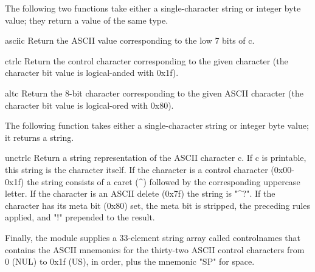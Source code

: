 The following two functions take either a single-character string or
integer byte value; they return a value of the same type.

\begin{funcdesc}{ascii}{c}
Return the ASCII value corresponding to the low 7 bits of c.
\end{funcdesc}

\begin{funcdesc}{ctrl}{c}
Return the control character corresponding to the given character
(the character bit value is logical-anded with 0x1f).
\end{funcdesc}

\begin{funcdesc}{alt}{c}
Return the 8-bit character corresponding to the given ASCII character
(the character bit value is logical-ored with 0x80).
\end{funcdesc}

The following function takes either a single-character string or
integer byte value; it returns a string.

\begin{funcdesc}{unctrl}{c}
Return a string representation of the ASCII character c.  If c is
printable, this string is the character itself.  If the character
is a control character (0x00-0x1f) the string consists of a caret
(^) followed by the corresponding uppercase letter.  If the character
is an ASCII delete (0x7f) the string is "^?".  If the character has
its meta bit (0x80) set, the meta bit is stripped, the preceding rules
applied, and "!" prepended to the result.
\end{funcdesc}

Finally, the module supplies a 33-element string array 
called controlnames that contains the ASCII mnemonics for the
thirty-two ASCII control characters from 0 (NUL) to 0x1f (US),
in order, plus the mnemonic "SP" for space.

 
